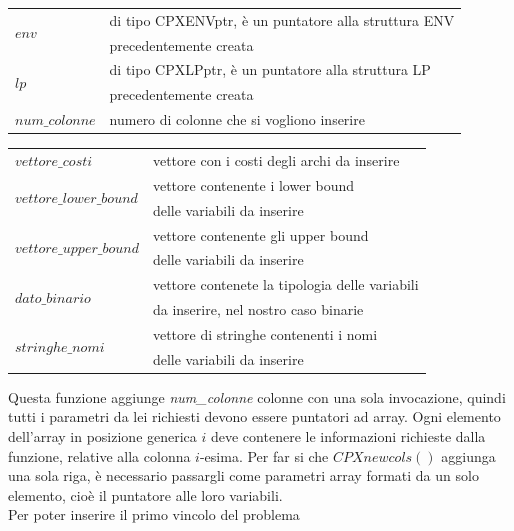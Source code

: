 \begin{table}[h]
\begin{tabular}{ll}
\multirow{2}{*}{$env$} & di tipo CPXENVptr, è un puntatore alla struttura ENV  \\
                  & precedentemente creata \\
\multirow{2}{*}{$lp$} & di tipo CPXLPptr, è un puntatore alla struttura LP  \\
                  & precedentemente creata \\
$num\_colonne$ & numero di colonne che si vogliono inserire \\
\end{tabular}
\end{table}
\begin{table}[h]
\begin{tabular}{ll}    
$vettore\_costi$ & vettore con i costi degli archi da inserire \\
\multirow{2}{*}{$vettore\_lower\_bound$} & vettore contenente i lower bound  \\
                  & delle variabili da inserire \\              
\multirow{2}{*}{$vettore\_upper\_bound$} & vettore contenente gli upper bound   \\
                  &  delle variabili da inserire \\
\multirow{2}{*}{$dato\_binario$} & vettore contenete la tipologia delle variabili  \\
                  & da inserire, nel nostro caso binarie \\

\multirow{2}{*}{$stringhe\_nomi$} & vettore di stringhe contenenti i nomi  \\
                  & delle variabili da inserire
\end{tabular}
\end{table}

Questa funzione aggiunge \textit{num\_colonne} colonne con una sola invocazione, quindi tutti i parametri da lei richiesti devono essere puntatori ad array. Ogni elemento dell'array in posizione generica $i$ deve contenere le informazioni richieste dalla funzione, relative alla colonna $i$-esima. Per far si che $CPXnewcols()$ aggiunga una sola riga, è necessario passargli come parametri array formati da un solo elemento, cioè il puntatore alle loro variabili.\\

Per poter inserire il primo vincolo del problema\\

